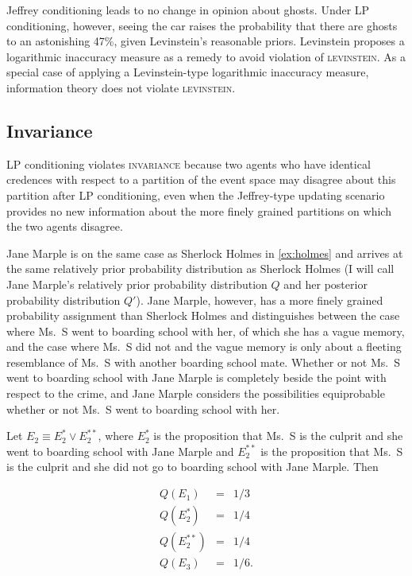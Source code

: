 \documentclass[12pt]{article}
\begin{document}
Jeffrey conditioning leads to no change in opinion about ghosts. Under
LP conditioning, however, seeing the car raises the probability that
there are ghosts to an astonishing 47\%, given Levinstein's reasonable
priors. Levinstein proposes a logarithmic inaccuracy measure as a
remedy to avoid violation of \textsc{levinstein}. As a special case of
applying a Levinstein-type logarithmic inaccuracy measure, information
theory does not violate \textsc{levinstein}.

\subsection{Invariance}
\label{Invariance}

LP conditioning violates \textsc{invariance} because two agents who
have identical credences with respect to a partition of the event
space may disagree about this partition after LP conditioning, even
when the Jeffrey-type updating scenario provides no new information
about the more finely grained partitions on which the two agents
disagree. 

\begin{quotex}
  \label{ex:marple} Jane Marple is on the same
  case as Sherlock Holmes in {\xample} \ref{ex:holmes} and arrives at
  the same relatively prior probability distribution as Sherlock
  Holmes (I will call Jane Marple's relatively prior probability
  distribution $Q$ and her posterior probability distribution $Q'$).
  Jane Marple, however, has a more finely grained probability
  assignment than Sherlock Holmes and distinguishes between the case
  where Ms.\ S went to boarding school with her, of which she has a
  vague memory, and the case where Ms.\ S did not and the vague memory
  is only about a fleeting resemblance of Ms.\ S with another boarding
  school mate. Whether or not Ms.\ S went to boarding school with Jane
  Marple is completely beside the point with respect to the crime, and
  Jane Marple considers the possibilities equiprobable whether or not
  Ms.\ S went to boarding school with her.
\end{quotex}

Let $E_{2}\equiv{}E_{2}^{*}\vee{}E_{2}^{**}$, where $E_{2}^{*}$ is the
proposition that Ms.\ S is the culprit and she went to boarding school
with Jane Marple and $E_{2}^{**}$ is the proposition that Ms.\ S is
the culprit and she did not go to boarding school with Jane Marple.
Then

\begin{equation}
  \label{eq:marpleprior}
  \begin{array}{rcl}
  Q(E_{1})&=&1/3\\
  Q(E_{2}^{*})&=&1/4\\
  Q(E_{2}^{**})&=&1/4\\
  Q(E_{3})&=&1/6.
\end{array}
\end{equation}
\end{document}
